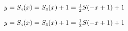 {$y = S_{\text{\tiny $4$}}(x) = S_{\text{\tiny $3$}}(x) + 1 = \frac{1}{2}S(-x+1) + 1$}
{$y = S_{\text{\tiny $4$}}(x) = S_{\text{\tiny $3$}}(x) + 1 = \frac{1}{2}S(-x+1) + 1$

}